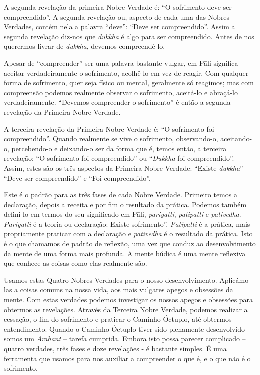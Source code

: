 A segunda revelação da primeira Nobre Verdade é: “O sofrimento deve ser
compreendido”. A segunda revelação ou, aspecto de cada uma das Nobres Verdades,
contém nela a palavra “deve”: “Deve ser compreendido”. Assim a segunda revelação
diz-nos que \emph{dukkha} é algo para ser compreendido. Antes de nos querermos livrar
de \emph{dukkha}, devemos compreendê-lo.

Apesar de “compreender” ser uma palavra bastante vulgar, em Pāli significa
aceitar verdadeiramente o sofrimento, acolhê-lo em vez de reagir. Com qualquer
forma de sofrimento, quer seja físico ou mental, geralmente só reagimos; mas com
compreensão podemos realmente observar o sofrimento, aceitá-lo e abraçá-lo
verdadeiramente. “Devemos compreender o sofrimento” é então a segunda revelação
da Primeira Nobre Verdade.

A terceira revelação da Primeira Nobre Verdade é: “O sofrimento foi
compreendido”. Quando realmente se vive o sofrimento, observando-o, aceitando-o,
percebendo-o e deixando-o ser da forma que é, temos então, a terceira revelação:
“O sofrimento foi compreendido” ou “\emph{Dukkha} foi compreendido”. Assim,
estes são os três aspectos da Primeira Nobre Verdade: “Existe \emph{dukkha}”
“Deve ser compreendido” e “Foi compreendido”.

\sectionBreak

Este é o padrão para as três fases de cada Nobre Verdade. Primeiro temos a
declaração, depois a receita e por fim o resultado da prática. Podemos também
defini-lo em termos do seu significado em Pāli, \emph{pariyatti},
\emph{patipatti} e \emph{pativedha}. \emph{Pariyatti} é a teoria ou declaração:
Existe sofrimento”. \emph{Patipatti} é a prática, mais propriamente praticar com
a declaração e \emph{pativedha} é o resultado da prática. Isto é o que chamamos
de padrão de reflexão, uma vez que conduz ao desenvolvimento da mente de uma
forma mais profunda. A mente búdica é uma mente reflexiva que conhece as coisas
como elas realmente são.

Usamos estas Quatro Nobres Verdades para o nosso desenvolvimento. Aplicámo-las a
coisas comuns na nossa vida, aos mais vulgares apegos e obsessões da mente. Com
estas verdades podemos investigar os nossos apegos e obsessões para obtermos as
revelações. Através da Terceira Nobre Verdade, podemos realizar a cessação, o
fim do sofrimento e praticar o Caminho Óctuplo, até obtermos entendimento.
Quando o Caminho Óctuplo tiver sido plenamente desenvolvido somos um
\emph{Arahant} – tarefa cumprida. Embora isto possa parecer complicado – quatro
verdades, três fases e doze revelações - é bastante simples. É uma ferramenta
que usamos para nos auxiliar a compreender o que é, e o que não é o sofrimento.

